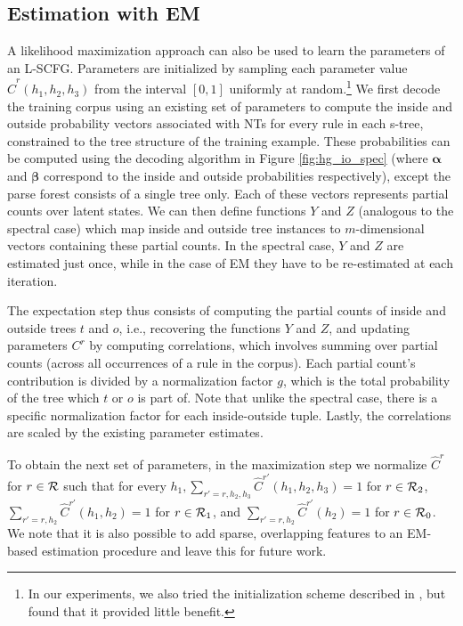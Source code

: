 \documentclass[11pt]{article}
\newcommand{\rules}{{\cal R}}
\newcommand{\e}[1]{\hat{#1}}
\newcommand{\balpha}{\bm{\alpha}}
\newcommand{\bbeta}{\bm{\beta}}
\begin{document}
\subsection{Estimation with EM}
\label{sec:em}
A likelihood maximization approach can also be used to learn the parameters of an L-SCFG.  
Parameters are initialized by sampling each parameter value $\e{C}^r(h_1, h_2, h_3)$ from the interval $[0,1]$ uniformly at random.\footnote{In our experiments, we also tried the initialization scheme described in , but found that it provided little benefit.}
We first decode the training corpus using an existing set of parameters to compute the inside and outside probability vectors associated with NTs for every rule in each s-tree, constrained to the tree structure of the training example. 
These probabilities can be computed using the decoding algorithm in Figure \ref{fig:hg_io_spec} (where $\balpha$ and $\bbeta$ correspond to the inside and outside probabilities respectively), except the parse forest consists of a single tree only. 
Each of these vectors represents partial counts over latent states.  
We can then define functions $Y$ and $Z$ (analogous to the spectral case) which map inside and outside tree instances to $m$-dimensional vectors containing these partial counts. 
In the spectral case, $Y$ and $Z$ are estimated just once, while in the case of EM they have to be re-estimated at each iteration.

The expectation step thus consists of computing the partial counts of inside and outside trees $t$ and $o$, i.e., recovering the functions $Y$ and $Z$, and updating parameters $C^r$ by computing correlations, which involves summing over partial counts (across all occurrences of a rule in the corpus). 
Each partial count's contribution is divided by a normalization factor $g$, which is the total probability of the tree which $t$ or $o$ is part of.  
Note that unlike the spectral case, there is a specific normalization factor for each inside-outside tuple. 
Lastly, the correlations are scaled by the existing parameter estimates.

To obtain the next set of parameters, in the maximization step we normalize $\e{C}^r$ for $r \in \rules$ such that for every $h_1, \sum_{r'=r,h_2,h_3} \e{C}^{r'}(h_1, h_2, h_3) = 1$ for $r \in \rules_2$, $\sum_{r'=r,h_2} \e{C}^{r'}(h_1, h_2) = 1$ for $r \in \rules_1$, and $\sum_{r'=r,h_2} \e{C}^{r'}(h_2) = 1$ for $r \in \rules_0$.  
We note that it is also possible to add sparse, overlapping features to an EM-based estimation procedure \cite{Berg-Kirkpatrick2010} and leave this for future work.  
\end{document}
